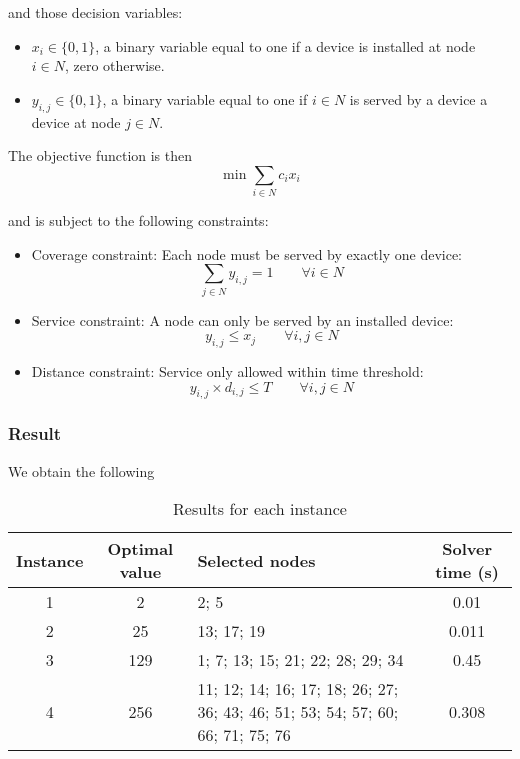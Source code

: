 \documentclass[10pt]{article}
\begin{document}
    and those decision variables:
    \begin{itemize}
        \item $x_i \in \{0,1\}$, a binary variable equal to one if a device is installed at node $i \in N$, zero otherwise.
        \item $y_{i,j} \in \{0,1\}$, a binary variable equal to one if $i \in N$ is served by a device a device at node $j \in N$.
    \end{itemize}

    The objective function is then
    \begin{equation}
        \min \sum_{i \in N} c_i x_i
    \end{equation}

    and is subject to the following constraints:
    \begin{itemize}
        \item Coverage constraint: Each node must be served by exactly one device:
        \[
            \sum_{j \in N} y_{i,j} = 1 \qquad \forall i \in N
        \]
        \item Service constraint: A node can only be served by an installed device:
        \[
            y_{i,j} \le x_j \qquad \forall i,j \in N
        \]
        \item Distance constraint: Service only allowed within time threshold:
        \[
            y_{i,j} \times d_{i,j} \le T \qquad \forall i,j \in N
        \]
    \end{itemize}

    \subsubsection{Result}
    We obtain the following

    \begin{table}[h!]
        \centering
        \begin{tabularx}{\textwidth}{|c|c|X|c|}
            \hline
            \textbf{Instance} & \textbf{Optimal value} & \textbf{Selected nodes} & \textbf{Solver time (s)} \\
            \hline
            1 & 2 & 2; 5 & 0.01 \\
            \hline
            2 & 25 & 13; 17; 19 & 0.011 \\
            \hline
            3 & 129 & 1; 7; 13; 15; 21; 22; 28; 29; 34 & 0.45 \\
            \hline
            4 & 256 & 11; 12; 14; 16; 17; 18; 26; 27; 36; 43; 46; 51; 53; 54; 57; 60; 66; 71; 75; 76 & 0.308 \\
            \hline
        \end{tabularx}
        \caption{Results for each instance}
        \label{tab:instance_costs}
    \end{table}
\end{document}

